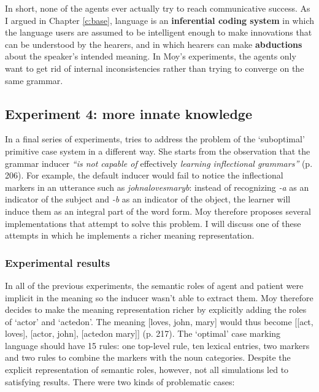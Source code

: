 In short, none of the agents ever actually try to reach communicative success. As I argued in Chapter \ref{c:base}, language is an {\bfseries inferential coding system} in which the language users are assumed to be intelligent enough to make innovations that can be understood by the hearers, and in which hearers can make {\bfseries abductions} about the speaker's intended meaning. In Moy's experiments, the agents only want to get rid of internal inconsistencies rather than trying to converge on the same grammar.

\subsection{Experiment 4: more innate knowledge}

In a final series of experiments, \citet[chapter 7]{moy06case} tries to address the problem of the `suboptimal' primitive case system in a different way. She starts from the observation that the grammar inducer {\em ``is not capable of} effectively {\em learning inflectional grammars''} (p. 206). For example, the default inducer would fail to notice the inflectional markers in an utterance such as {\em johnalovesmaryb}: instead of recognizing {\em -a} as an indicator of the subject and {\em -b} as an indicator of the object, the learner will induce them as an integral part of the word form. Moy therefore proposes several implementations that attempt to solve this problem. I will discuss one of these attempts in which he implements a richer meaning representation.


\subsubsection{Experimental results}
In all of the previous experiments, the semantic roles of agent and patient were implicit in the meaning so the inducer wasn't able to extract them. Moy therefore decides to make the meaning representation richer by explicitly adding the roles of `actor' and `actedon'. The meaning [loves, john, mary] would thus become [[act, loves], [actor, john], [actedon mary]] (p. 217). The `optimal' case marking language should have 15 rules: one top-level rule, ten lexical entries, two markers and two rules to combine the markers with the noun categories. Despite the explicit representation of semantic roles, however, not all simulations led to satisfying results. There were two kinds of problematic cases:

